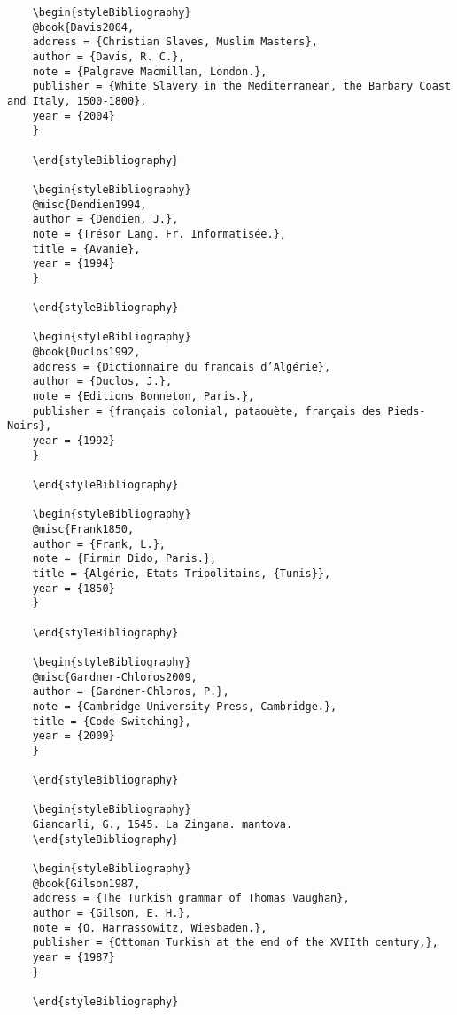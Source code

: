 \documentclass[output=paper]{langsci/langscibook}
\begin{document}
\begin{stylelsUnNumberedSection}
\begin{verbatim}
	\begin{styleBibliography}
	@book{Davis2004,
	address = {Christian Slaves, Muslim Masters},
	author = {Davis, R. C.},
	note = {Palgrave Macmillan, London.},
	publisher = {White Slavery in the Mediterranean, the Barbary Coast and Italy, 1500-1800},
	year = {2004}
	}
	
	\end{styleBibliography}
	
	\begin{styleBibliography}
	@misc{Dendien1994,
	author = {Dendien, J.},
	note = {Trésor Lang. Fr. Informatisée.},
	title = {Avanie},
	year = {1994}
	}
	
	\end{styleBibliography}
	
	\begin{styleBibliography}
	@book{Duclos1992,
	address = {Dictionnaire du francais d’Algérie},
	author = {Duclos, J.},
	note = {Editions Bonneton, Paris.},
	publisher = {français colonial, pataouète, français des Pieds-Noirs},
	year = {1992}
	}
	
	\end{styleBibliography}
	
	\begin{styleBibliography}
	@misc{Frank1850,
	author = {Frank, L.},
	note = {Firmin Dido, Paris.},
	title = {Algérie, Etats Tripolitains, {Tunis}},
	year = {1850}
	}
	
	\end{styleBibliography}
	
	\begin{styleBibliography}
	@misc{Gardner-Chloros2009,
	author = {Gardner-Chloros, P.},
	note = {Cambridge University Press, Cambridge.},
	title = {Code-Switching},
	year = {2009}
	}
	
	\end{styleBibliography}
	
	\begin{styleBibliography}
	Giancarli, G., 1545. La Zingana. mantova.
	\end{styleBibliography}
	
	\begin{styleBibliography}
	@book{Gilson1987,
	address = {The Turkish grammar of Thomas Vaughan},
	author = {Gilson, E. H.},
	note = {O. Harrassowitz, Wiesbaden.},
	publisher = {Ottoman Turkish at the end of the XVIIth century,},
	year = {1987}
	}
	
	\end{styleBibliography}
	

\end{verbatim}
\end{stylelsUnNumberedSection}
\end{document}
